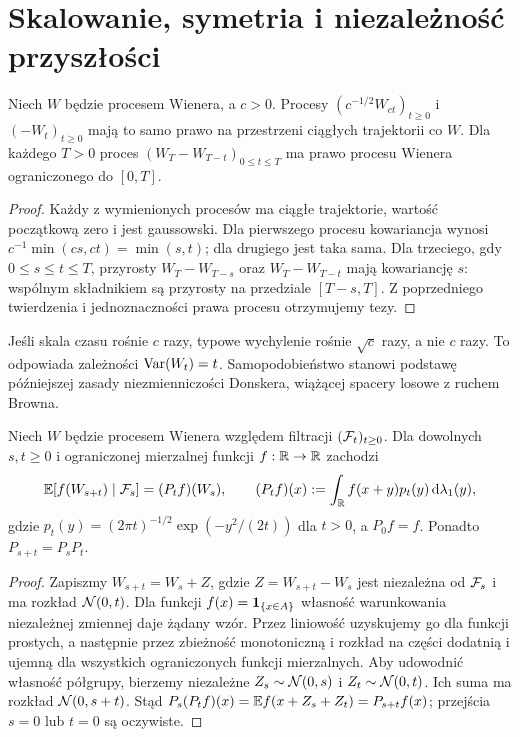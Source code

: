 \section{Skalowanie, symetria i niezależność przyszłości}
\begin{twierdzenie}
Niech $W$ będzie procesem Wienera, a $c>0$.
Procesy $(c^{-1/2}W_{ct})_{t\ge0}$ i
$(-W_t)_{t\ge0}$ mają to samo prawo na przestrzeni
ciągłych trajektorii co $W$. Dla każdego $T>0$ proces
$(W_T-W_{T-t})_{0\le t\le T}$ ma prawo procesu Wienera
ograniczonego do $[0,T]$.
\end{twierdzenie}
\begin{proof}
Każdy z wymienionych procesów ma ciągłe trajektorie,
wartość początkową zero i jest gaussowski.
Dla pierwszego procesu kowariancja wynosi
$c^{-1}\min(cs,ct)=\min(s,t)$; dla drugiego
jest taka sama. Dla trzeciego, gdy $0\le s\le t\le T$,
przyrosty $W_T-W_{T-s}$ oraz $W_T-W_{T-t}$ mają
kowariancję $s$: wspólnym składnikiem są przyrosty
na przedziale $[T-s,T]$. Z poprzedniego twierdzenia
i jednoznaczności prawa procesu otrzymujemy tezy.
\end{proof}

\begin{uwaga}
Jeśli skala czasu rośnie $c$ razy, typowe wychylenie
rośnie $\sqrt c$ razy, a nie $c$ razy.
To odpowiada zależności $\operatorname{Var}(W_t)=t$.
Samopodobieństwo stanowi podstawę późniejszej zasady
niezmienniczości Donskera, wiążącej spacery losowe z
ruchem Browna.
\end{uwaga}

\begin{twierdzenie}
Niech $W$ będzie procesem Wienera względem filtracji
$(\mathcal{F}_t)_{t\ge0}$. Dla dowolnych $s,t\ge0$
i ograniczonej mierzalnej funkcji $f:\mathbb{R}\to\mathbb{R}$ zachodzi
\[
\mathbb{E}[f(W_{s+t})\mid\mathcal{F}_s]
=(P_tf)(W_s),\qquad
(P_tf)(x):=\int_{\mathbb{R}} f(x+y)p_t(y)\,\mathrm{d}\lambda_1(y),
\]
gdzie $p_t(y)=(2\pi t)^{-1/2}\exp(-y^2/(2t))$ dla $t>0$,
a $P_0f=f$. Ponadto $P_{s+t}=P_sP_t$.
\end{twierdzenie}
\begin{proof}
Zapiszmy $W_{s+t}=W_s+Z$, gdzie $Z=W_{s+t}-W_s$
jest niezależna od $\mathcal{F}_s$ i ma rozkład $\mathcal{N}(0,t)$.
Dla funkcji $f(x)=\mathbf{1}_{\{x\in A\}}$ własność
warunkowania niezależnej zmiennej daje żądany wzór.
Przez liniowość uzyskujemy go dla funkcji prostych, a
następnie przez zbieżność monotoniczną i rozkład na
części dodatnią i ujemną dla wszystkich ograniczonych
funkcji mierzalnych.
Aby udowodnić własność półgrupy, bierzemy niezależne
$Z_s\sim\mathcal{N}(0,s)$ i $Z_t\sim\mathcal{N}(0,t)$.
Ich suma ma rozkład $\mathcal{N}(0,s+t)$. Stąd
$P_s(P_tf)(x)=\mathbb{E} f(x+Z_s+Z_t)=P_{s+t}f(x)$;
przejścia $s=0$ lub $t=0$ są oczywiste.
\end{proof}

